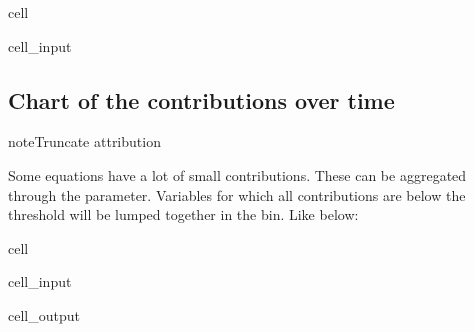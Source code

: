 \documentclass[letterpaper,10pt,english]{jupyterBook}
\begin{document}
\begin{sphinxuseclass}{cell}\begin{sphinxVerbatimInput}

\begin{sphinxuseclass}{cell_input}
\begin{sphinxVerbatim}[commandchars=\\\{\}]
\end{sphinxVerbatim}

\end{sphinxuseclass}\end{sphinxVerbatimInput}

\end{sphinxuseclass}

\subsection{Chart of the contributions over time}
\label{\detokenize{content/06_ModelAnalytics/Attribution:chart-of-the-contributions-over-time}}
\begin{sphinxadmonition}{note}{Truncate attribution}

\sphinxAtStartPar
Some equations have a lot of small contributions. These can be aggregated through the  parameter.
Variables for which all contributions are below the threshold will be lumped together in the  bin. Like below:
\end{sphinxadmonition}

\begin{sphinxuseclass}{cell}\begin{sphinxVerbatimInput}

\begin{sphinxuseclass}{cell_input}
\begin{sphinxVerbatim}[commandchars=\\\{\}]
 
\end{sphinxVerbatim}

\end{sphinxuseclass}\end{sphinxVerbatimInput}
\begin{sphinxVerbatimOutput}

\begin{sphinxuseclass}{cell_output}
\noindent{}

\end{sphinxuseclass}\end{sphinxVerbatimOutput}

\end{sphinxuseclass}
\end{document}
